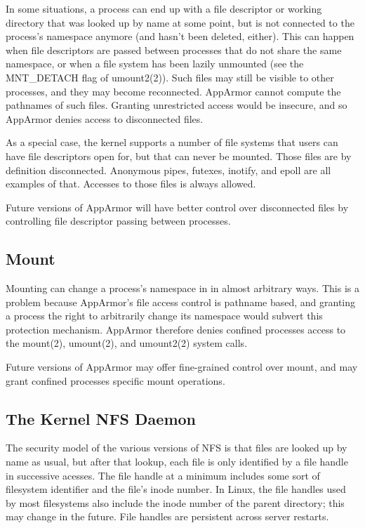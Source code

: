 \documentclass[a4paper]{article}
\begin{document}
In some situations, a process can end up with a file descriptor or
working directory that was looked up by name at some point, but is not
connected to the process's namespace anymore (and hasn't been deleted,
either).  This can happen when file descriptors are passed between
processes that do not share the same namespace, or when a file system
has been lazily unmounted (see the MNT\_DETACH flag of umount2(2)).  Such
files may still be visible to other processes, and they may become
reconnected.  AppArmor cannot compute the pathnames of such files.
Granting unrestricted access would be insecure, and so AppArmor denies
access to disconnected files.

As a special case, the kernel supports a number of file systems that
users can have file descriptors open for, but that can never be mounted.
Those files are by definition disconnected.  Anonymous pipes, futexes,
inotify, and epoll are all examples of that.  Accesses to those files
is always allowed.

Future versions of AppArmor will have better control over disconnected
files by controlling file descriptor passing between processes.


\subsection{Mount}

Mounting can change a process's namespace in in almost arbitrary ways.
This is a problem because AppArmor's file access control is pathname
based, and granting a process the right to arbitrarily change its
namespace would subvert this protection mechanism.  AppArmor therefore
denies confined processes access to the mount(2), umount(2), and
umount2(2) system calls.

Future versions of AppArmor may offer fine-grained control over mount,
and may grant confined processes specific mount operations.


\subsection{The Kernel NFS Daemon}

The security model of the various versions of NFS is that files are
looked up by name as usual, but after that lookup, each file is only
identified by a file handle in successive acesses.  The file handle at a
minimum includes some sort of filesystem identifier and the file's inode
number.  In Linux, the file handles used by most filesystems also
include the inode number of the parent directory; this may change in the
future.  File handles are persistent across server restarts.
\end{document}
